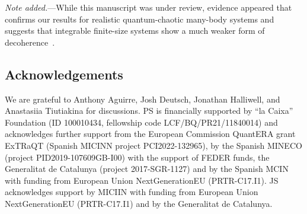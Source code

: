\documentclass[pre,twocolumn,10pt,aps,longbibliography,nofootinbib]{revtex4-1}
\newcommand{\blue}[1]{#1}
\begin{document}
\blue{\emph{Note added.}---While this manuscript was under review, evidence appeared that confirms our results for realistic quantum-chaotic many-body systems and suggests that integrable finite-size systems show a much weaker form of decoherence~\cite{WangStrasbergArXiv2024}.}


\subsection*{Acknowledgements}

We are grateful to Anthony Aguirre, Josh Deutsch, Jonathan Halliwell, and Anastasiia Tiutiakina for discussions.
PS is financially supported by ``la Caixa'' Foundation (ID 100010434, fellowship code LCF/BQ/PR21/11840014)
and acknowledges further support from the European Commission QuantERA grant ExTRaQT (Spanish MICINN project
PCI2022-132965), by the Spanish MINECO (project PID2019-107609GB-I00) with the support of FEDER funds, the Generalitat
de Catalunya (project 2017-SGR-1127) and by the Spanish MCIN with funding from European Union NextGenerationEU
(PRTR-C17.I1). JS acknowledges support by MICIIN with funding from European Union NextGenerationEU (PRTR-C17.I1) and
by the Generalitat de Catalunya.



\end{document}
